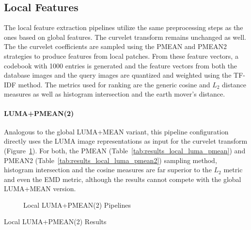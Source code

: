 \subsection{Local Features}

The local feature extraction pipelines utilize the same preprocessing steps as
the ones based on global features. The curvelet transform remains unchanged as
well. The the curvelet coefficients are sampled using the PMEAN and PMEAN2
strategies to produce features from local patches. From these feature vectors,
a codebook with 1000 entries is generated and the feature vectors from both the
database images and the query images are quantized and weighted using the
TF-IDF method. The metrics used for ranking are the generic cosine and $L_2$
distance measures as well as histogram intersection and the earth mover's
distance.

\paragraph{LUMA+PMEAN(2)}

Analogous to the global LUMA+MEAN variant, this pipeline configuration directly
uses the LUMA image representations as input for the curvelet transform
(Figure~\ref{fig:pipeline_local_luma_pmean}). For both, the PMEAN
(Table~\ref{tab:results_local_luma_pmean}) and PMEAN2
(Table~\ref{tab:results_local_luma_pmean2}) sampling method, histogram
intersection and the cosine measures are far superior to the $L_2$ metric and
even the EMD metric, although the results cannot compete with the global
LUMA+MEAN version.

\begin{figure}[h]
    \centering
    
    \caption[Local LUMA+PMEAN(2) Pipelines]{
        Local LUMA+PMEAN(2) Pipelines
    }
    \label{fig:pipeline_local_luma_pmean}
\end{figure}

\begin{table}[h]
    \centering
    \quad
    \caption[Local LUMA+PMEAN(2) Results]{
        Local LUMA+PMEAN(2) Results
    }
    \label{tab:results_local_luma_pmean_all}
\end{table}

